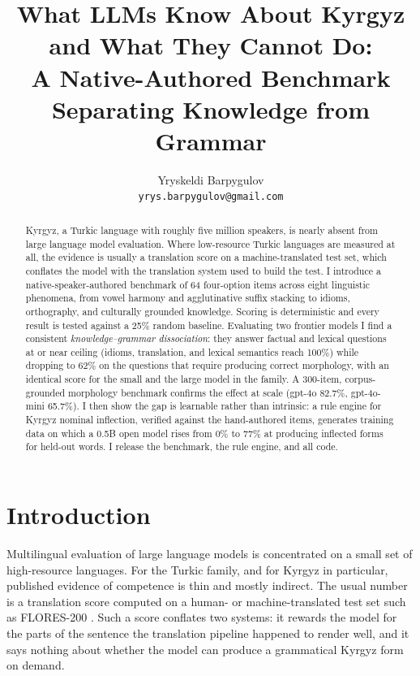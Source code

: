 \documentclass[11pt]{article}
\title{What LLMs Know About Kyrgyz and What They Cannot Do:\\
A Native-Authored Benchmark Separating Knowledge from Grammar}
\author{
  Yryskeldi Barpygulov \\
  \texttt{yrys.barpygulov@gmail.com}
}
\date{}
\begin{document}
\maketitle

\begin{abstract}
Kyrgyz, a Turkic language with roughly five million speakers, is nearly absent from
large language model evaluation. Where low-resource Turkic languages are measured at
all, the evidence is usually a translation score on a machine-translated test set,
which conflates the model with the translation system used to build the test.
I introduce a native-speaker-authored benchmark of 64 four-option items across eight
linguistic phenomena, from vowel harmony and agglutinative suffix stacking to idioms,
orthography, and culturally grounded knowledge. Scoring is deterministic and every
result is tested against a 25\% random baseline. Evaluating two frontier models I
find a consistent \emph{knowledge--grammar dissociation}: they answer factual and
lexical questions at or near ceiling (idioms, translation, and lexical semantics reach
100\%) while dropping to 62\% on the questions that require producing correct
morphology, with an identical score for the small and the large model in the family.
A 300-item, corpus-grounded morphology benchmark confirms the effect at scale
(gpt-4o 82.7\%, gpt-4o-mini 65.7\%). I then show the gap is learnable rather than
intrinsic: a rule engine for Kyrgyz nominal inflection, verified against the
hand-authored items, generates training data on which a 0.5B open model rises from
0\% to 77\% at producing inflected forms for held-out words. I release the benchmark,
the rule engine, and all code.
\end{abstract}

\section{Introduction}
\label{sec:intro}

Multilingual evaluation of large language models is concentrated on a small set of
high-resource languages. For the Turkic family, and for Kyrgyz in particular,
published evidence of competence is thin and mostly indirect. The usual number is a
translation score computed on a human- or machine-translated test set such as
FLORES-200 \cite{nllb2022}. Such a score conflates two systems: it rewards the model
for the parts
of the sentence the translation pipeline happened to render well, and it says nothing
about whether the model can produce a grammatical Kyrgyz form on demand.
\end{document}
